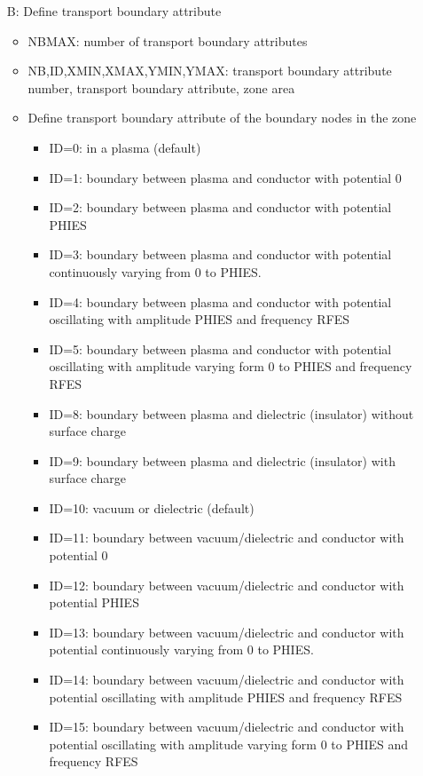 \begin{enumerate}
\begin{itemize}
\item[B:]
Define transport boundary attribute
\begin{itemize}
\item
NBMAX: number of transport boundary attributes
\item
NB,ID,XMIN,XMAX,YMIN,YMAX: transport boundary attribute number,
transport boundary attribute, zone area
\item
Define transport boundary attribute of the boundary nodes in the zone
\begin{itemize}
\item
ID=0: in a plasma (default)
\item
ID=1: boundary between plasma and conductor with potential 0
\item
ID=2: boundary between plasma and conductor with potential PHIES
\item
ID=3: boundary between plasma and conductor with potential
continuously varying from 0 to PHIES.
\item
ID=4: boundary between plasma and conductor with potential oscillating
with amplitude PHIES and frequency RFES
\item
ID=5: boundary between plasma and conductor with potential oscillating
with amplitude varying form 0 to PHIES and frequency RFES
\item
ID=8: boundary between plasma and dielectric (insulator) without
surface charge
\item
ID=9: boundary between plasma and dielectric (insulator) with
surface charge
\item
ID=10: vacuum or dielectric (default)
\item
ID=11: boundary between vacuum/dielectric and conductor with potential 0
\item
ID=12: boundary between vacuum/dielectric and conductor with potential PHIES
\item
ID=13: boundary between vacuum/dielectric and conductor with potential
continuously varying from 0 to PHIES.
\item
ID=14: boundary between vacuum/dielectric and conductor with potential oscillating
with amplitude PHIES and frequency RFES
\item
ID=15: boundary between vacuum/dielectric and conductor with potential oscillating
with amplitude varying form 0 to PHIES and frequency RFES
\end{itemize}
\end{itemize}


\end{itemize}
\end{enumerate}
